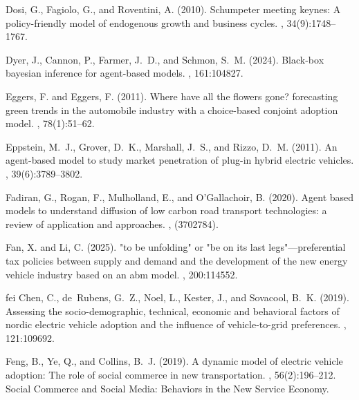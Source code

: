 \documentclass[12pt]{article}
\begin{document}
\begin{thebibliography}{}
Dosi, G., Fagiolo, G., and Roventini, A. (2010).
\newblock Schumpeter meeting keynes: A policy-friendly model of endogenous
  growth and business cycles.
, 34(9):1748--1767.

Dyer, J., Cannon, P., Farmer, J.~D., and Schmon, S.~M. (2024).
\newblock Black-box bayesian inference for agent-based models.
, 161:104827.

Eggers, F. and Eggers, F. (2011).
\newblock Where have all the flowers gone? forecasting green trends in the
  automobile industry with a choice-based conjoint adoption model.
, 78(1):51--62.

Eppstein, M.~J., Grover, D.~K., Marshall, J.~S., and Rizzo, D.~M. (2011).
\newblock An agent-based model to study market penetration of plug-in hybrid
  electric vehicles.
, 39(6):3789--3802.

Fadiran, G., Rogan, F., Mulholland, E., and O'Gallachoir, B. (2020).
\newblock Agent based models to understand diffusion of low carbon road
  transport technologies: a review of application and approaches.
, (3702784).

Fan, X. and Li, C. (2025).
\newblock "to be unfolding" or "be on its last legs"—preferential tax
  policies between supply and demand and the development of the new energy
  vehicle industry based on an abm model.
, 200:114552.

fei Chen, C., de~Rubens, G.~Z., Noel, L., Kester, J., and Sovacool, B.~K.
  (2019).
\newblock Assessing the socio-demographic, technical, economic and behavioral
  factors of nordic electric vehicle adoption and the influence of
  vehicle-to-grid preferences.
, 121:109692.

Feng, B., Ye, Q., and Collins, B.~J. (2019).
\newblock A dynamic model of electric vehicle adoption: The role of social
  commerce in new transportation.
, 56(2):196--212.
\newblock Social Commerce and Social Media: Behaviors in the New Service
  Economy.


\end{thebibliography}
\end{document}
